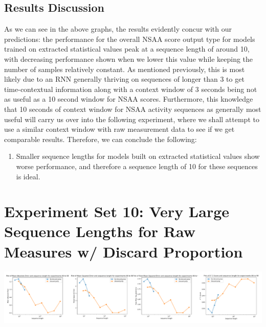 \documentclass[12pt,twoside]{report}
\begin{document}
\subsection{Results Discussion}

\quad As we can see in the above graphs, the results evidently concur with our predictions: the performance for the overall NSAA score output type for models trained on extracted statistical values peak at a sequence length of around 10, with decreasing performance shown when we lower this value while keeping the number of samples relatively constant. As mentioned previously, this is most likely due to an RNN generally thriving on sequences of longer than 3 to get time-contextual information along with a context window of 3 seconds being not as useful as a 10 second window for NSAA scores. Furthermore, this knowledge that 10 seconds of context window for NSAA activity sequences as generally most useful will carry us over into the following experiment, where we shall attempt to use a similar context window with raw measurement data to see if we get comparable results. Therefore, we can conclude the following:

\begin{enumerate}
	\item Smaller sequence lengths for models built on extracted statistical values show worse performance, and therefore a sequence length of 10 for these sequences is ideal.
\end{enumerate}



\section{Experiment Set 10: Very Large Sequence Lengths for Raw Measures w/ Discard Proportion}

\begin{center}
\includegraphics[scale=0.35]{project_figures/fig10_17}
\end{center}
\end{document}
